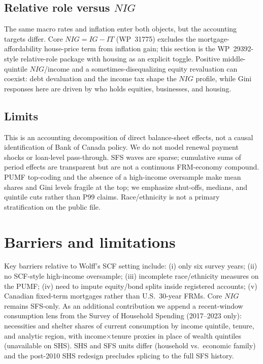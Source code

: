 \documentclass[11pt]{article}
\begin{document}
\subsection{Relative role versus $NIG$}

The same macro rates and inflation enter both objects, but the accounting targets differ. Core $NIG=IG-IT$ (WP~31775) excludes the mortgage-affordability house-price term from inflation gain; this section is the WP~29392-style relative-role package with housing as an explicit toggle. Positive middle-quintile $NIG$/income and a sometimes-disequalizing equity revaluation can coexist: debt devaluation and the income tax shape the $NIG$ profile, while Gini responses here are driven by who holds equities, businesses, and housing.

\subsection{Limits}

This is an accounting decomposition of direct balance-sheet effects, not a causal identification of Bank of Canada policy. We do not model renewal payment shocks or loan-level pass-through. SFS waves are sparse; cumulative sums of period effects are transparent but are not a continuous FRM-economy compound. PUMF top-coding and the absence of a high-income oversample make mean shares and Gini levels fragile at the top; we emphasize shut-offs, medians, and quintile cuts rather than P99 claims. Race/ethnicity is not a primary stratification on the public file.

\section{Barriers and limitations}
\label{sec:barriers}

Key barriers relative to Wolff's SCF setting include: (i) only six survey years; (ii) no SCF-style high-income oversample; (iii) incomplete race/ethnicity measures on the PUMF; (iv) need to impute equity/bond splits inside registered accounts; (v) Canadian fixed-term mortgages rather than U.S.\ 30-year FRMs. Core $NIG$ remains SFS-only. As an additional contribution we append a recent-window consumption lens from the Survey of Household Spending (2017--2023 only): necessities and shelter shares of current consumption by income quintile, tenure, and analytic region, with income$\times$tenure proxies in place of wealth quintiles (unavailable on SHS). SHS and SFS units differ (household vs.\ economic family) and the post-2010 SHS redesign precludes splicing to the full SFS history.
\end{document}
